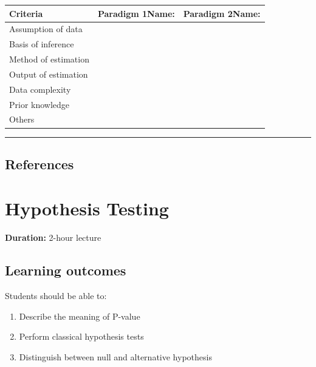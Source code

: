 \documentclass[
]{book}
\newcounter{none} %
\providecommand{\tightlist}{%
  \setlength{\itemsep}{0pt}\setlength{\parskip}{0pt}}
\begin{document}
{\def\LTcaptype{none} %
\begin{longtable}[]{@{}
  >{\raggedright\arraybackslash}p{}
  >{\raggedright\arraybackslash}p{}
  >{\raggedright\arraybackslash}p{}@{}}
\toprule\noalign{}
\begin{minipage}[b]{\linewidth}\raggedright
Criteria
\end{minipage} & \begin{minipage}[b]{\linewidth}\raggedright
Paradigm 1Name:
\end{minipage} & \begin{minipage}[b]{\linewidth}\raggedright
Paradigm 2Name:
\end{minipage} \\
\midrule\noalign{}
\endhead
\bottomrule\noalign{}
\endlastfoot
Assumption of data & & \\
Basis of inference & & \\
Method of estimation & & \\
Output of estimation & & \\
Data complexity & & \\
Prior knowledge & & \\
Others & & \\
\end{longtable}
}

\begin{center}\rule{0.5\linewidth}{0.5pt}\end{center}

\section{References}\label{references-6}

\chapter{Hypothesis Testing}\label{hypothesis-testing-1}

\textbf{Duration:} 2-hour lecture

\section{Learning outcomes}\label{learning-outcomes-7}

Students should be able to:

\begin{enumerate}
\def\labelenumi{\arabic{enumi}.}
\tightlist
\item
  Describe the meaning of P-value
\item
  Perform classical hypothesis tests
\item
  Distinguish between null and alternative hypothesis
\end{enumerate}
\end{document}
